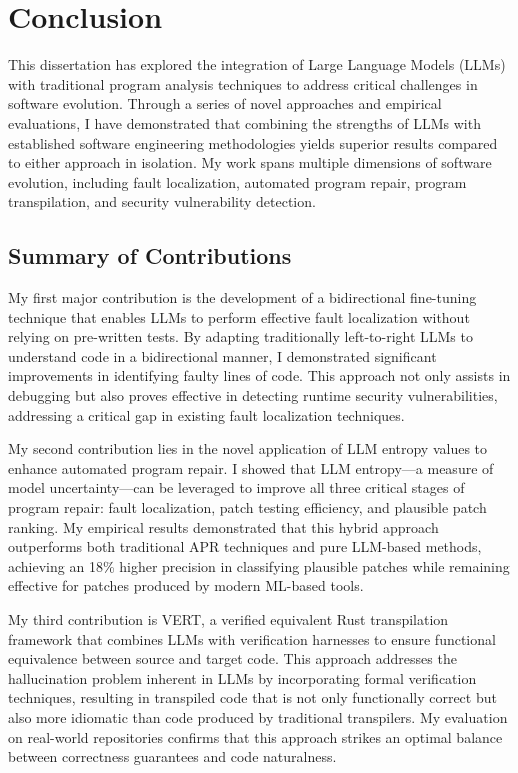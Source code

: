 \chapter{Conclusion}
\label{sec:conclusion}

This dissertation has explored the integration of Large Language Models (LLMs) with traditional program analysis techniques to address critical challenges in software evolution. Through a series of novel approaches and empirical evaluations, I have demonstrated that combining the strengths of LLMs with established software engineering methodologies yields superior results compared to either approach in isolation. My work spans multiple dimensions of software evolution, including fault localization, automated program repair, program transpilation, and security vulnerability detection.

\section{Summary of Contributions}

My first major contribution is the development of a bidirectional fine-tuning technique that enables LLMs to perform effective fault localization without relying on pre-written tests. By adapting traditionally left-to-right LLMs to understand code in a bidirectional manner, I demonstrated significant improvements in identifying faulty lines of code. This approach not only assists in debugging but also proves effective in detecting runtime security vulnerabilities, addressing a critical gap in existing fault localization techniques.

My second contribution lies in the novel application of LLM entropy values to enhance automated program repair. I showed that LLM entropy—a measure of model uncertainty—can be leveraged to improve all three critical stages of program repair: fault localization, patch testing efficiency, and plausible patch ranking. My empirical results demonstrated that this hybrid approach outperforms both traditional APR techniques and pure LLM-based methods, achieving an 18\% higher precision in classifying plausible patches while remaining effective for patches produced by modern ML-based tools.

My third contribution is VERT, a verified equivalent Rust transpilation framework that combines LLMs with verification harnesses to ensure functional equivalence between source and target code. This approach addresses the hallucination problem inherent in LLMs by incorporating formal verification techniques, resulting in transpiled code that is not only functionally correct but also more idiomatic than code produced by traditional transpilers. My evaluation on real-world repositories confirms that this approach strikes an optimal balance between correctness guarantees and code naturalness.

